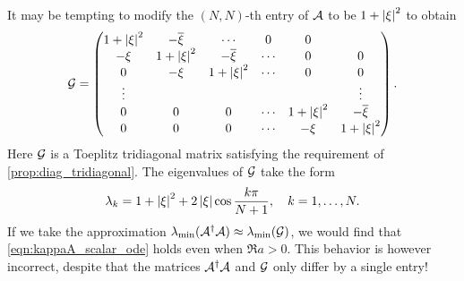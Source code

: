 \begin{rem}
It may be tempting to modify the $(N,N)$-th entry of $\mathcal{A}$ to be $1+\left\lvert\xi\right\rvert^2$ to obtain
\begin{equation}
\mathcal{G}=\begin{pmatrix}
1+\left\lvert\xi\right\rvert^2 &  -\overline{\xi} & \cdots & 0 & 0\\
-\xi & 1+\left\lvert\xi\right\rvert^2 & -\overline{\xi} & \cdots & 0 & 0\\
0 & -\xi & 1+\left\lvert\xi\right\rvert^2 & \cdots & 0 & 0\\
\vdots & & & & &\vdots\\
0& 0 & 0 & \cdots & 1+\left\lvert\xi\right\rvert^2 & -\overline{\xi}\\
0& 0 & 0 & \cdots & -\xi & 1+\left\lvert\xi\right\rvert^2
\end{pmatrix}.
\end{equation}
Here  $\mathcal{G}$ is a Toeplitz tridiagonal matrix satisfying the requirement of \cref{prop:diag_tridiagonal}.
The eigenvalues of $\mathcal{G}$ take the form 
\begin{equation}
\lambda_k=1+\left\lvert\xi\right\rvert^2+2\left\lvert\xi\right\rvert \cos \frac{k\pi}{N+1}, \quad k=1,\ldots,N.
\end{equation}
If we take the approximation $\lambda_{\min}(\mathcal{A}^{\dag}\mathcal{A})\approx \lambda_{\min}(\mathcal{G})$, we would find that \cref{eqn:kappaA_scalar_ode} holds even when $\Re a>0$.
This behavior is however incorrect,  despite that the matrices $\mathcal{A}^{\dag}\mathcal{A}$ and $\mathcal{G}$ only differ by a single entry!
\end{rem}
% 
% 
% 
